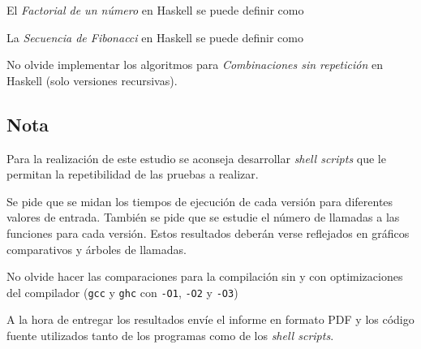 El \emph{Factorial de un número} en Haskell se puede definir como


La \emph{Secuencia de Fibonacci} en Haskell se puede definir como


No olvide implementar los algoritmos para \emph{Combinaciones sin repetición}
en Haskell (solo versiones recursivas).

\subsection*{Nota}

Para la realización de este estudio se aconseja desarrollar \emph{shell scripts}
que le permitan la repetibilidad de las pruebas a realizar.

Se pide que se midan los tiempos de ejecución de cada versión para
diferentes valores de entrada. También se pide que se estudie el número
de llamadas a las funciones para cada versión. Estos resultados deberán
verse reflejados en gráficos comparativos y árboles de llamadas.

No olvide hacer las comparaciones para la compilación sin y con optimizaciones
del compilador (\verb|gcc| y \verb|ghc| con \verb|-O1|, \verb|-O2| y
\verb|-O3|) 

A la hora de entregar los resultados envíe el informe en formato PDF y
los código fuente utilizados tanto de los programas como de los \emph{shell scripts}.

